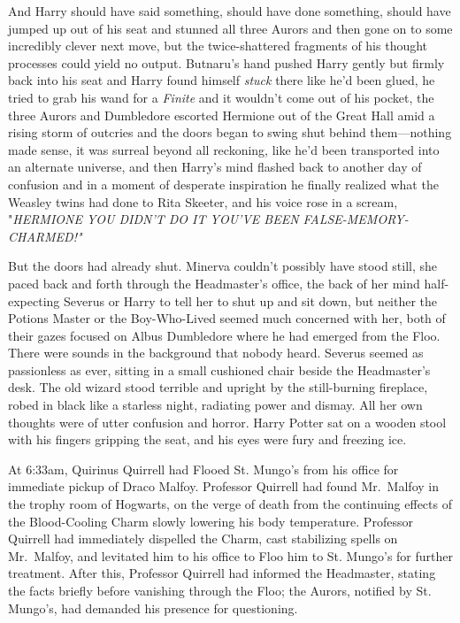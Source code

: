 And Harry should have said something, should have done something, should have jumped up out of his seat and stunned all three Aurors and then gone on to some incredibly clever next move, but the twice-shattered fragments of his thought processes could yield no output. Butnaru's hand pushed Harry gently but firmly back into his seat and Harry found himself \emph{stuck} there like he'd been glued, he tried to grab his wand for a \emph{Finite} and it wouldn't come out of his pocket, the three Aurors and Dumbledore escorted Hermione out of the Great Hall amid a rising storm of outcries and the doors began to swing shut behind them---nothing made sense, it was surreal beyond all reckoning, like he'd been transported into an alternate universe, and then Harry's mind flashed back to another day of confusion and in a moment of desperate inspiration he finally realized what the Weasley twins had done to Rita Skeeter, and his voice rose in a scream, "\emph{HERMIONE YOU DIDN'T DO IT YOU'VE BEEN FALSE-MEMORY-CHARMED!"}

But the doors had already shut.
\sbreak
Minerva couldn't possibly have stood still, she paced back and forth through the Headmaster's office, the back of her mind half-expecting Severus or Harry to tell her to shut up and sit down, but neither the Potions Master or the Boy-Who-Lived seemed much concerned with her, both of their gazes focused on Albus Dumbledore where he had emerged from the Floo. There were sounds in the background that nobody heard. Severus seemed as passionless as ever, sitting in a small cushioned chair beside the Headmaster's desk. The old wizard stood terrible and upright by the still-burning fireplace, robed in black like a starless night, radiating power and dismay. All her own thoughts were of utter confusion and horror. Harry Potter sat on a wooden stool with his fingers gripping the seat, and his eyes were fury and freezing ice.

At 6:33am, Quirinus Quirrell had Flooed St. Mungo's from his office for immediate pickup of Draco Malfoy. Professor Quirrell had found Mr.~Malfoy in the trophy room of Hogwarts, on the verge of death from the continuing effects of the Blood-Cooling Charm slowly lowering his body temperature. Professor Quirrell had immediately dispelled the Charm, cast stabilizing spells on Mr.~Malfoy, and levitated him to his office to Floo him to St. Mungo's for further treatment. After this, Professor Quirrell had informed the Headmaster, stating the facts briefly before vanishing through the Floo; the Aurors, notified by St. Mungo's, had demanded his presence for questioning.

